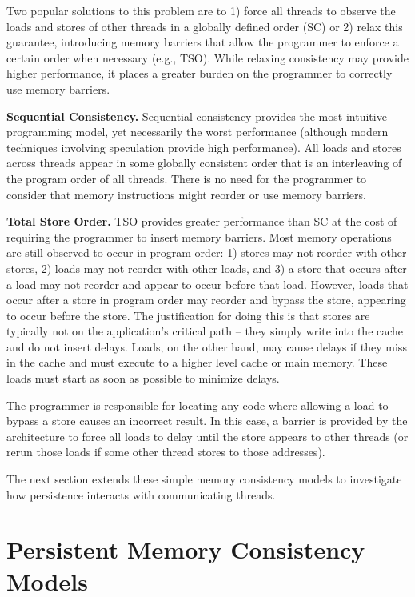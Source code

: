 Two popular solutions to this problem are to 1) force all threads to observe the loads and stores of other threads in a globally defined order (SC) or 2) relax this guarantee, introducing memory barriers that allow the programmer to enforce a certain order when necessary (e.g., TSO).
While relaxing consistency may provide higher performance, it places a greater burden on the programmer to correctly use memory barriers.

\textbf{Sequential Consistency.}
Sequential consistency provides the most intuitive programming model, yet necessarily the worst performance (although modern techniques involving speculation provide high performance).
All loads and stores across threads appear in some globally consistent order that is an interleaving of the program order of all threads.
There is no need for the programmer to consider that memory instructions might reorder or use memory barriers.

\textbf{Total Store Order.}
TSO provides greater performance than SC at the cost of requiring the programmer to insert memory barriers.
Most memory operations are still observed to occur in program order: 1) stores may not reorder with other stores, 2) loads may not reorder with other loads, and 3) a store that occurs after a load may not reorder and appear to occur before that load.
However, loads that occur after a store in program order may reorder and bypass the store, appearing to occur before the store.
The justification for doing this is that stores are typically not on the application's critical path -- they simply write into the cache and do not insert delays.
Loads, on the other hand, may cause delays if they miss in the cache and must execute to a higher level cache or main memory.
These loads must start as soon as possible to minimize delays.

The programmer is responsible for locating any code where allowing a load to bypass a store causes an incorrect result.
In this case, a barrier is provided by the architecture to force all loads to delay until the store appears to other threads (or rerun those loads if some other thread stores to those addresses).

The next section extends these simple memory consistency models to investigate how persistence interacts with communicating threads.

\section{Persistent Memory Consistency Models}
\label{sec:PMC:PersistenceModels}

